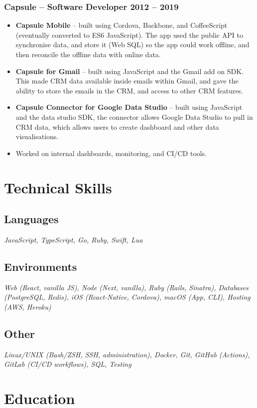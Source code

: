 \documentclass[a4paper]{article}
\newcommand{\datedsubsection}[2]{
  \subsubsection{#1 \hfill \textbf{#2}}
}
\begin{document}
\datedsubsection{\textbf{Capsule} -- Software Developer}{2012 -- 2019}
\begin{itemize}
  \item \textbf{Capsule Mobile} -- built using Cordova, Backbone, and
    CoffeeScript (eventually converted to ES6 JavaScript). The app used the
    public API to synchronise data, and store it (Web SQL) so the app could work
    offline, and then reconcile the offline data with online data.
  \item \textbf{Capsule for Gmail} -- built using JavaScript and the Gmail add
    on SDK. This made CRM  data available inside emails within Gmail, and gave
    the ability to store the emails in the CRM, and access to other CRM
    features.
  \item \textbf{Capsule Connector for Google Data Studio} -- built using
    JavaScript and the data studio SDK, the connector allows Google Data Studio
    to pull in CRM data, which allows users to create dashboard and other data
    visualisations.
  \item Worked on internal dashboards, monitoring, and CI/CD tools.
\end{itemize}

\section{Technical Skills}

\subsection{Languages}
\textit{JavaScript, TypeScript, Go, Ruby, Swift, Lua}

\subsection{Environments}
\textit{Web (React, vanilla JS), Node (Next, vanilla), Ruby (Rails, Sinatra),
Databases (PostgreSQL, Redis), iOS (React-Native, Cordova), macOS (App, CLI),
Hosting (AWS, Heroku)}

\subsection{Other}
\textit{Linux/UNIX (Bash/ZSH, SSH, administration), Docker, Git, GitHub
(Actions), GitLab (CI/CD workflows), SQL, Testing}

\section{Education}
\end{document}
